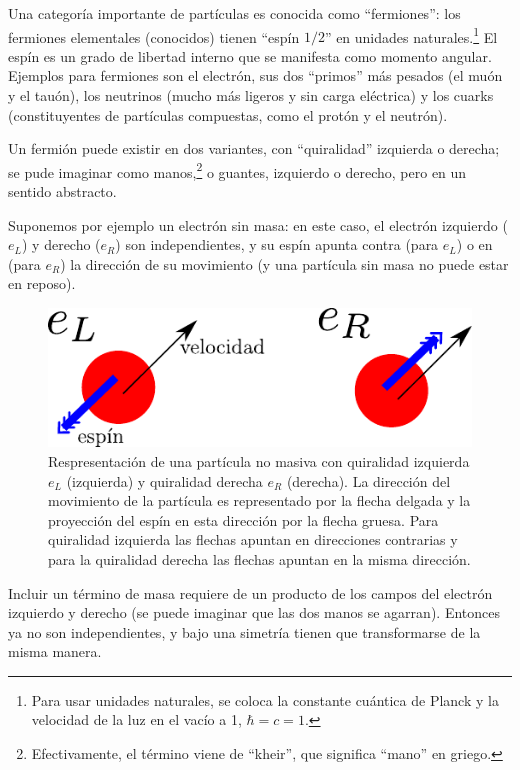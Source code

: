 Una categor\'ia importante de part\'iculas es conocida como
``fermiones'': los fermiones elementales (conocidos) tienen
``esp\'in $1/2 $'' en unidades naturales.\footnote{Para
usar unidades naturales, se coloca la constante
cu\'antica de Planck y la velocidad de la luz en el vac\'io a 1,
$\hbar = c =1$.}
El esp\'in es un grado de libertad interno que se manifesta como
momento angular. Ejemplos para fermiones son el electr\'on, sus dos
``primos'' m\'as pesados (el mu\'on y el tau\'on), los neutrinos (mucho
m\'as ligeros y sin carga el\'ectrica) y los cuarks (constituyentes
de part\'iculas compuestas, como el prot\'on y el neutr\'on).

Un fermi\'on puede existir en dos variantes, con ``quiralidad''
izquierda o derecha; se pude imaginar como manos,\footnote{Efectivamente,
el t\'ermino viene de ``kheir'', que significa ``mano'' en griego.} 
o guantes, izquierdo o derecho, pero en un sentido abstracto.

Suponemos por ejemplo un electr\'{o}n sin masa: en este caso,
el electr\'on izquierdo ($e_L$) y derecho ($e_R$) son independientes,
y su esp\'in apunta contra (para $e_L$) o en (para $e_R$) la
direcci\'on de su movimiento (y una part\'icula sin masa no
puede estar en reposo).


\begin{figure}
\centering
\includegraphics[scale=1]{images/quiral.pdf}
\caption{Respresentaci\' on de una part\'icula no masiva con quiralidad izquierda $e_L$ (izquierda) y quiralidad derecha $e_R$ (derecha). La direcci\'on del movimiento de la part\'icula es representado por la flecha delgada y la proyecci\'on del esp\'in en esta direcci\'on por la flecha gruesa. Para quiralidad izquierda las flechas apuntan en direcciones contrarias y para la quiralidad derecha las flechas apuntan en la misma direcci\'on.}
\end{figure}
Incluir un t\'ermino de masa requiere de un producto de los campos
del electr\'on izquierdo y derecho (se puede imaginar que las dos
manos se agarran). Entonces ya no son independientes, y bajo una
simetr\'ia tienen que transformarse de la misma manera.

